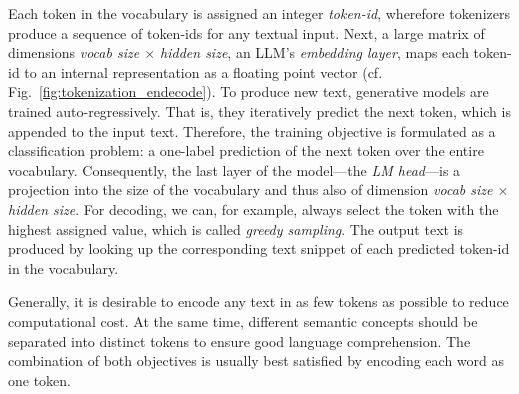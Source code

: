 \documentclass[11pt]{article}
\newcommand\todo[1]{\textcolor{red}{#1}}
\begin{document}
Each token in the vocabulary is assigned an integer \textit{token-id}, wherefore tokenizers produce a sequence of token-ids for any textual input. 
Next, a large matrix of dimensions \emph{vocab size $\times$ hidden size}, an LLM's \textit{embedding layer}, maps each token-id to an internal representation as a floating point vector (cf. Fig.~\ref{fig:tokenization_endecode}). 
%
To produce new text, generative models are trained auto-regressively. That is, they iteratively predict the next token, which is appended to the input text. 
Therefore, the training objective is formulated as a classification problem: a one-label prediction of the next token over the entire vocabulary. 
Consequently, the last layer of the model---the \textit{LM head}---is a projection into the size of the vocabulary and thus also of dimension \emph{vocab size $\times$ hidden size}. For decoding, we can, for example, always select the token with the highest assigned value, which is called \textit{greedy sampling}.
The output text is produced by looking up the corresponding text snippet of each predicted token-id in the vocabulary.

Generally, it is desirable to encode any text in as few tokens as possible to reduce computational cost. 
At the same time, different semantic concepts should be separated into distinct tokens to ensure good language comprehension. The combination of both objectives is usually best satisfied by encoding each word as one token. 
\end{document}
